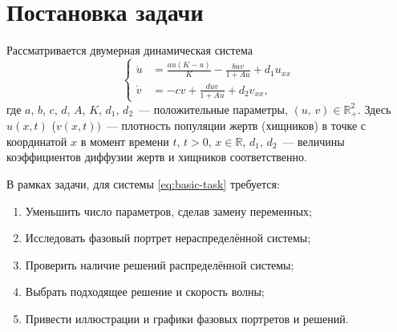\documentclass[a4paper, 11pt]{article}
\newcommand{\R}{\mathbb{R}}
\begin{document}
	\section{Постановка задачи}
	Рассматривается двумерная динамическая система
	\begin{equation}\label{eq:basic-task}
		\left\{\begin{aligned}
			\dot u &= \frac{au(K - u)}{K} - \frac{buv}{1+Au} + d_1 u_{xx} \\
			\dot v &= -cv + \frac{duv}{1 + Au} +d_2 v_{xx},
		\end{aligned}\right.
	\end{equation}
	где $a$, $b$, $c$, $d$, $A$, $K$, $d_1$, $d_2$~--- положительные параметры, $(u,\,v) \in \R^2_{+}$.
	Здесь $u(x,t)$ ($v(x,t))$~--- плотность популяции жертв (хищников) в точке с координатой $x$ в момент времени $t$, $t > 0$, $x \in \R$, $d_1,\,d_2$~--- величины коэффициентов диффузии жертв и хищников соответственно.

	В рамках задачи, для системы \eqref{eq:basic-task} требуется:
	\begin{enumerate}
		\item Уменьшить число параметров, сделав замену переменных;
		\item Исследовать фазовый портрет нераспределённой системы;
		\item Проверить наличие решений распределённой системы;
		\item Выбрать подходящее решение и скорость волны;
		\item Привести иллюстрации и графики фазовых портретов и решений.
	\end{enumerate}
\end{document}
